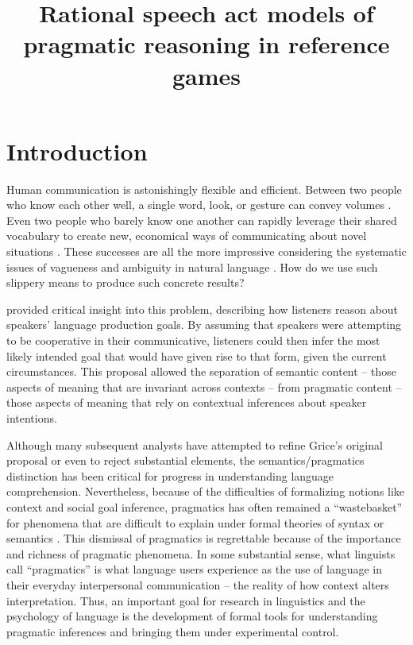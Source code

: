\documentclass[man,noapacite]{apa2}
\title{\vspace{-2ex} Rational speech act models of pragmatic reasoning in reference games}
\begin{document}
\maketitle

\section{Introduction}

Human communication is astonishingly flexible and efficient. Between two people who know each other well, a single word, look, or gesture can convey volumes \cite{sperber1986,clark1996}. Even two people who barely know one another can rapidly leverage their shared vocabulary to create new, economical ways of communicating about novel situations \cite{brennan1996,clark1991}. These successes are all the more impressive considering the systematic issues of vagueness and ambiguity in natural language \cite{keefe1997,wasow2005}. How do we use such slippery means to produce such concrete results?

 provided critical insight into this problem, describing how listeners reason about speakers' language production goals. By assuming that speakers were attempting to be cooperative in their communicative, listeners could then infer the most likely intended goal that would have given rise to that form, given the current circumstances. This proposal allowed the separation of semantic content -- those aspects of meaning that are invariant across contexts -- from pragmatic content -- those aspects of meaning that rely on contextual inferences about speaker intentions.

Although many subsequent analysts have attempted to refine Grice's original proposal or even to reject substantial elements, the semantics/pragmatics distinction has been critical for progress in understanding language comprehension. Nevertheless, because of the difficulties of formalizing notions like context and social goal inference, pragmatics has often remained a ``wastebasket'' for phenomena that are difficult to explain under formal theories of syntax or semantics \cite{bar-hillel1971}. This dismissal of pragmatics is regrettable because of the importance and richness of pragmatic phenomena. In some substantial sense, what linguists call ``pragmatics'' is what language users experience as the use of language in their everyday interpersonal communication -- the reality of how context alters interpretation. Thus, an important goal for research in linguistics and the psychology of language is the development of formal tools for understanding pragmatic inferences and bringing them under experimental control.
\end{document}
